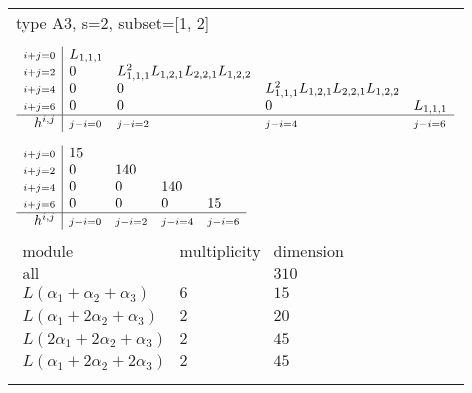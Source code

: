 \documentclass[crop,border=2mm]{standalone}
\begin{document}
\begin{tabular}{l}
{\huge type A3, s=2, subset=[1, 2]}\\ \\


$\displaystyle
\begin{array}{r|l l l l}
	{\scriptstyle i+j=0}&L_{1,1,1}&&&\\
	{\scriptstyle i+j=2}&0&L_{1,1,1}^{2}L_{1,2,1}L_{2,2,1}L_{1,2,2}&&\\
	{\scriptstyle i+j=4}&0&0&L_{1,1,1}^{2}L_{1,2,1}L_{2,2,1}L_{1,2,2}&\\
	{\scriptstyle i+j=6}&0&0&0&L_{1,1,1}\\
	\hline h^{i,j}&{\scriptstyle j-i=0}&{\scriptstyle j-i=2}&{\scriptstyle j-i=4}&{\scriptstyle j-i=6}
\end{array}
$ \\ \\


$\displaystyle
\begin{array}{r|l l l l}
	{\scriptstyle i+j=0}&15&&&\\
	{\scriptstyle i+j=2}&0&140&&\\
	{\scriptstyle i+j=4}&0&0&140&\\
	{\scriptstyle i+j=6}&0&0&0&15\\
	\hline h^{i,j}&{\scriptstyle j-i=0}&{\scriptstyle j-i=2}&{\scriptstyle j-i=4}&{\scriptstyle j-i=6}
\end{array}
$ \\ \\


$\displaystyle
\begin{array}{rll}
	\text{module}&\text{multiplicity}&\text{dimension} \\ \hline \text{all}&&310 \\
	L\left(\alpha_{1}+\alpha_{2}+\alpha_{3}\right)&6&15\\
	L\left(\alpha_{1}+ 2\alpha_{2}+\alpha_{3}\right)&2&20\\
	L\left( 2\alpha_{1}+ 2\alpha_{2}+\alpha_{3}\right)&2&45\\
	L\left(\alpha_{1}+ 2\alpha_{2}+ 2\alpha_{3}\right)&2&45
\end{array}
$ \\ \\

\end{tabular}
\end{document}
